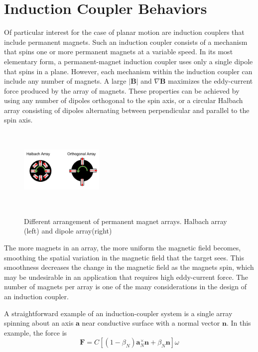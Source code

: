 \section{Induction Coupler Behaviors}

Of particular interest for the case of planar motion are induction couplers that include permanent magnets. Such an induction coupler consists of a mechanism that spins one or more permanent magnets at a variable speed. In its most elementary form, a permanent-magnet induction coupler uses only a single dipole that spins in a plane. However, each mechanism within the induction coupler can include any number of magnets. A large $\vert \textbf{B} \vert$ and $\nabla \textbf{B}$ maximizes the eddy-current force produced by the array of magnets. These properties can be achieved by using any number of dipoles orthogonal to the spin axis, or a circular Halbach array consisting of dipoles alternating between perpendicular and parallel to the spin axis.

\begin{figure}
\includegraphics[width = 4cm, height = 4cm ]{figures/Magnet_Arrays.png}
\label{fig:magnet_arrays}
\caption{Different arrangement of permanent magnet arrays. Halbach array (left) and dipole array(right)}
\end{figure}

The more magnets in an array, the more uniform the magnetic field becomes, smoothing the spatial variation in the magnetic field that the target sees. This smoothness decreases the change in the magnetic field as the magnets spin, which may be undesirable in an application that requires high eddy-current force. The number of magnets per array is one of the many considerations in the design of an induction coupler.

A straightforward example of an induction-coupler system is a single array spinning about an axis $\boldsymbol{a}$ near conductive surface with a normal vector $\boldsymbol{n}$. In this example, the force is 
\begin{equation}\label{singlemagforce}
\textbf{F} = C\left[  \left(1-\beta_N \right )\boldsymbol{a}_N^{\times}\boldsymbol{n} + \beta_N\boldsymbol{n} \right ] \omega
\end{equation}

